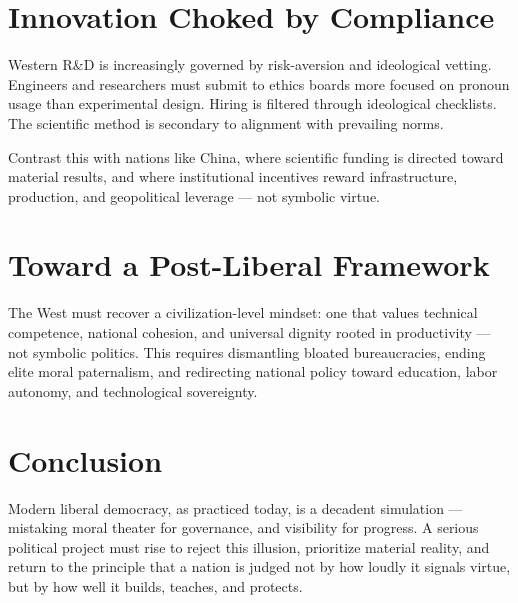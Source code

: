 \documentclass[11pt]{article}
\begin{document}
\section{Innovation Choked by Compliance}

Western R\&D is increasingly governed by risk-aversion and ideological vetting. Engineers and researchers must submit to ethics boards more focused on pronoun usage than experimental design. Hiring is filtered through ideological checklists. The scientific method is secondary to alignment with prevailing norms.

Contrast this with nations like China, where scientific funding is directed toward material results, and where institutional incentives reward infrastructure, production, and geopolitical leverage — not symbolic virtue.

\section{Toward a Post-Liberal Framework}

The West must recover a civilization-level mindset: one that values technical competence, national cohesion, and universal dignity rooted in productivity — not symbolic politics. This requires dismantling bloated bureaucracies, ending elite moral paternalism, and redirecting national policy toward education, labor autonomy, and technological sovereignty.

\section*{Conclusion}

Modern liberal democracy, as practiced today, is a decadent simulation — mistaking moral theater for governance, and visibility for progress. A serious political project must rise to reject this illusion, prioritize material reality, and return to the principle that a nation is judged not by how loudly it signals virtue, but by how well it builds, teaches, and protects.
\end{document}
